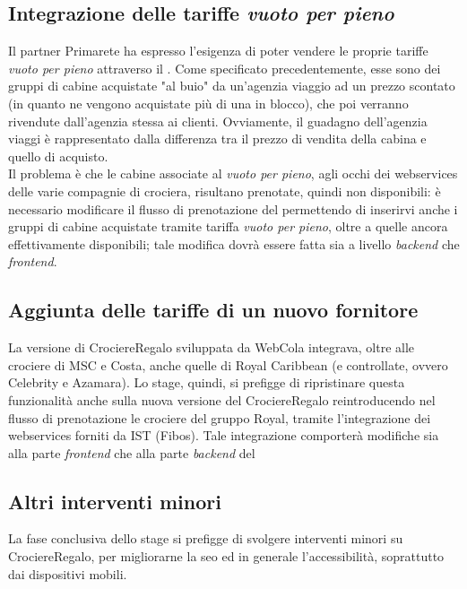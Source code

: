 \subsection{Integrazione delle tariffe \textit{vuoto per pieno}}
Il partner Primarete ha espresso l'esigenza di poter vendere le proprie tariffe \textit{vuoto per pieno} attraverso il \bookingEngine. Come specificato precedentemente, esse sono dei gruppi di cabine acquistate "al buio" da un'agenzia viaggio ad un prezzo scontato (in quanto ne vengono acquistate più di una in blocco), che poi verranno rivendute dall'agenzia stessa ai clienti. Ovviamente, il guadagno dell'agenzia viaggi è rappresentato dalla differenza tra il prezzo di vendita della cabina e quello di acquisto.\\
Il problema è che le cabine associate al \textit{vuoto per pieno}, agli occhi dei \glspl{webservice} delle varie compagnie di crociera, risultano prenotate, quindi non disponibili: è necessario modificare il flusso di prenotazione del \bookingEngine\hphantom{i}permettendo di inserirvi anche i gruppi di cabine acquistate tramite tariffa \textit{vuoto per pieno}, oltre a quelle ancora effettivamente disponibili; tale modifica dovrà essere fatta sia a livello \textit{backend} che \textit{frontend}.

\subsection{Aggiunta delle tariffe di un nuovo fornitore}
La versione di CrociereRegalo sviluppata da WebCola integrava, oltre alle crociere di MSC e Costa, anche quelle di Royal Caribbean (e controllate, ovvero Celebrity e Azamara). Lo stage, quindi, si prefigge di ripristinare questa funzionalità anche sulla nuova versione del \bookingEngine\hphantom{i}CrociereRegalo reintroducendo nel flusso di prenotazione le crociere del gruppo Royal, tramite l'integrazione dei \glspl{webservice} forniti da IST (Fibos). Tale integrazione comporterà modifiche sia alla parte \textit{frontend} che alla parte \textit{backend} del \bookingEngine


\subsection{Altri interventi minori}
\label{section:altri-interventi-minori}
La fase conclusiva dello stage si prefigge di svolgere interventi minori su CrociereRegalo, per migliorarne la \gls{seo} ed in generale l'accessibilità, soprattutto dai dispositivi mobili.

